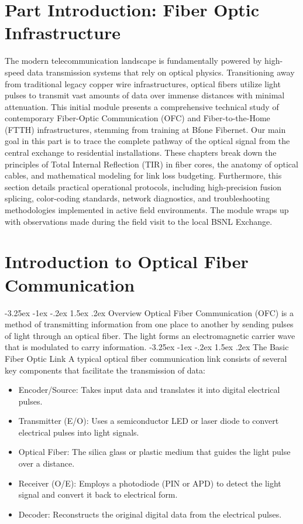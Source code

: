 \documentclass[11pt,a4paper]{report}
\makeatletter
\renewcommand{\section}{\@startsection{section}{1}{\z@}%
  {-3.25ex \@plus -1ex \@minus -.2ex}%
  {1.5ex \@plus.2ex}%
  {\normalfont\Large\bfseries\color{primaryColor}}}
\makeatother
\begin{document}
\chapter*{Part Introduction: Fiber Optic Infrastructure}
The modern telecommunication landscape is fundamentally powered by high-speed data transmission systems that rely on optical physics. Transitioning away from traditional legacy copper wire infrastructures, optical fibers utilize light pulses to transmit vast amounts of data over immense distances with minimal attenuation. This initial module presents a comprehensive technical study of contemporary Fiber-Optic Communication (OFC) and Fiber-to-the-Home (FTTH) infrastructures, stemming from training at Bfone Fibernet. Our main goal in this part is to trace the complete pathway of the optical signal from the central exchange to residential installations. These chapters break down the principles of Total Internal Reflection (TIR) in fiber cores, the anatomy of optical cables, and mathematical modeling for link loss budgeting. Furthermore, this section details practical operational protocols, including high-precision fusion splicing, color-coding standards, network diagnostics, and troubleshooting methodologies implemented in active field environments. The module wraps up with observations made during the field visit to the local BSNL Exchange.
\chapter{Introduction to Optical Fiber Communication}
\section{Overview}
Optical Fiber Communication (OFC) is a method of transmitting information from one place to another by sending pulses of light through an optical fiber. The light forms an electromagnetic carrier wave that is modulated to carry information.
\section{The Basic Fiber Optic Link}
A typical optical fiber communication link consists of several key components that facilitate the transmission of data:
\begin{itemize}
  \item Encoder/Source: Takes input data and translates it into digital electrical pulses.
  \item Transmitter (E/O): Uses a semiconductor LED or laser diode to convert electrical pulses into light signals.
  \item Optical Fiber: The silica glass or plastic medium that guides the light pulse over a distance.
  \item Receiver (O/E): Employs a photodiode (PIN or APD) to detect the light signal and convert it back to electrical form.
  \item Decoder: Reconstructs the original digital data from the electrical pulses.
\end{itemize}
\end{document}
